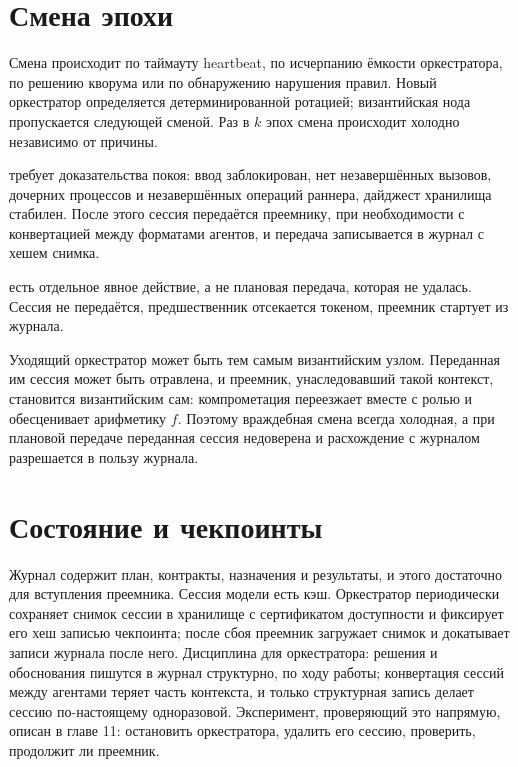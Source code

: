 \section{Смена эпохи}

Смена происходит по таймауту heartbeat, по исчерпанию ёмкости оркестратора, по решению кворума или по обнаружению нарушения правил. Новый оркестратор определяется детерминированной ротацией; византийская нода пропускается следующей сменой. Раз в $k$ эпох смена происходит холодно независимо от причины.

 требует доказательства покоя: ввод заблокирован, нет незавершённых вызовов, дочерних процессов и незавершённых операций раннера, дайджест хранилища стабилен. После этого сессия передаётся преемнику, при необходимости с конвертацией между форматами агентов, и передача записывается в журнал с хешем снимка.

 есть отдельное явное действие, а не плановая передача, которая не удалась. Сессия не передаётся, предшественник отсекается токеном, преемник стартует из журнала.

\begin{whybox}
Уходящий оркестратор может быть тем самым византийским узлом. Переданная им сессия может быть отравлена, и преемник, унаследовавший такой контекст, становится византийским сам: компрометация переезжает вместе с ролью и обесценивает арифметику $f$. Поэтому враждебная смена всегда холодная, а при плановой передаче переданная сессия недоверена и расхождение с журналом разрешается в пользу журнала.
\end{whybox}

\section{Состояние и чекпоинты}

Журнал содержит план, контракты, назначения и результаты, и этого достаточно для вступления преемника. Сессия модели есть кэш. Оркестратор периодически сохраняет снимок сессии в хранилище с сертификатом доступности и фиксирует его хеш записью чекпоинта; после сбоя преемник загружает снимок и докатывает записи журнала после него. Дисциплина для оркестратора: решения и обоснования пишутся в журнал структурно, по ходу работы; конвертация сессий между агентами теряет часть контекста, и только структурная запись делает сессию по-настоящему одноразовой. Эксперимент, проверяющий это напрямую, описан в главе 11: остановить оркестратора, удалить его сессию, проверить, продолжит ли преемник.

